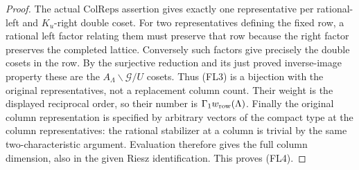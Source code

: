 \begin{proof}
The actual \(\mathrm{ColReps}\) assertion gives exactly one
representative per rational-left and \(K_u\)-right double
coset. For two representatives defining the fixed row,
a rational left factor relating them must preserve that row
because the right factor preserves the completed lattice.
Conversely such factors give precisely the double cosets
in the row. By the surjective reduction and its just proved
inverse-image property these are the
\(A_\Lambda\backslash\mathcal G/U\) cosets. Thus (FL3) is
a bijection with the original representatives, not a
replacement column count. Their weight is the displayed
reciprocal order, so their number is
\(\Gamma_1w_{\rm row}(\Lambda)\).
Finally the original column representation is specified by
arbitrary vectors of the compact type at the column
representatives: the rational stabilizer at a column is
trivial by the same two-characteristic argument. Evaluation
therefore gives the full column dimension, also in the
given Riesz identification. This proves (FL4).
\end{proof}

